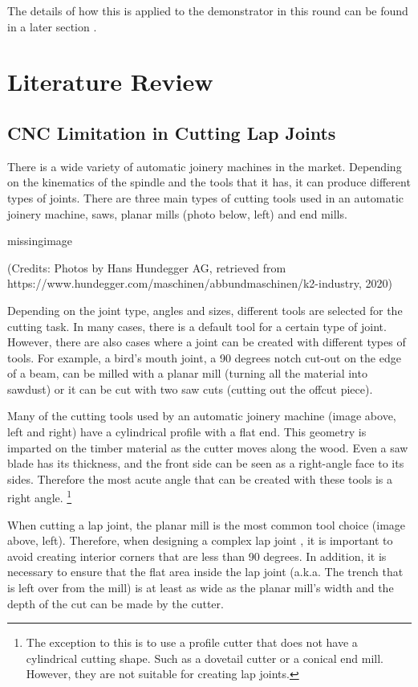 The details of how this is applied to the demonstrator in this round can be found in a later section .

\section{Literature Review}
\label{section:exploration-4-literature-review}

\subsection{CNC Limitation in Cutting Lap Joints}
\label{subsection:exploration-4-cnc-limitation-in-cutting-lap-joints}

There is a wide variety of automatic joinery machines in the market. Depending on the kinematics of the spindle and the tools that it has, it can produce different types of joints. There are three main types of cutting tools used in an automatic joinery machine, saws, planar mills (photo below, left) and end mills. 

missingimage

(Credits: Photos by Hans Hundegger AG, retrieved from https://www.hundegger.com/maschinen/abbundmaschinen/k2-industry, 2020)

Depending on the joint type, angles and sizes, different tools are selected for the cutting task. In many cases, there is a default tool for a certain type of joint. However, there are also cases where a joint can be created with different types of tools. For example, a bird's mouth joint, a 90 degrees notch cut-out on the edge of a beam, can be milled with a planar mill (turning all the material into sawdust) or it can be cut with two saw cuts (cutting out the offcut piece).

Many of the cutting tools used by an automatic joinery machine (image above, left and right) have a cylindrical profile with a flat end. This geometry is imparted on the timber material as the cutter moves along the wood. Even a saw blade has its thickness, and the front side can be seen as a right-angle face to its sides. Therefore the most acute angle that can be created with these tools is a right angle.
\footnote{The exception to this is to use a profile cutter that does not have a cylindrical cutting shape. Such as a dovetail cutter or a conical end mill. However, they are not suitable for creating lap joints.}

When cutting a lap joint, the planar mill is the most common tool choice (image above, left). Therefore, when designing a complex lap joint , it is important to avoid creating interior corners that are less than 90 degrees. In addition, it is necessary to ensure that the flat area inside the lap joint (a.k.a. The trench that is left over from the mill) is at least as wide as the planar mill’s width and the depth of the cut can be made by the cutter.

